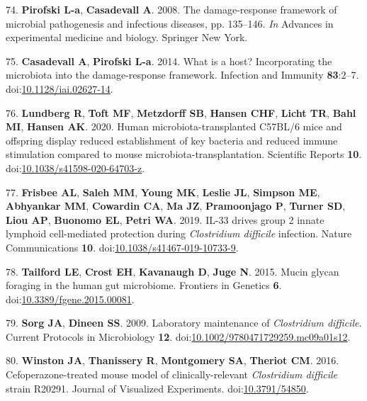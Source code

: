 \documentclass[
  12pt,
]{article}
\newenvironment{cslreferences}%
  {}%
  {\par}
\begin{document}
\begin{cslreferences}
\leavevmode\hypertarget{ref-Pirofski2008}{}%
74. \textbf{Pirofski L-a}, \textbf{Casadevall A}. 2008. The
damage-response framework of microbial pathogenesis and infectious
diseases, pp. 135--146. \emph{In} Advances in experimental medicine and
biology. Springer New York.

\leavevmode\hypertarget{ref-Casadevall2014}{}%
75. \textbf{Casadevall A}, \textbf{Pirofski L-a}. 2014. What is a host?
Incorporating the microbiota into the damage-response framework.
Infection and Immunity \textbf{83}:2--7.
doi:\href{https://doi.org/10.1128/iai.02627-14}{10.1128/iai.02627-14}.

\leavevmode\hypertarget{ref-Lundberg2020}{}%
76. \textbf{Lundberg R}, \textbf{Toft MF}, \textbf{Metzdorff SB},
\textbf{Hansen CHF}, \textbf{Licht TR}, \textbf{Bahl MI}, \textbf{Hansen
AK}. 2020. Human microbiota-transplanted C57BL/6 mice and offspring
display reduced establishment of key bacteria and reduced immune
stimulation compared to mouse microbiota-transplantation. Scientific
Reports \textbf{10}.
doi:\href{https://doi.org/10.1038/s41598-020-64703-z}{10.1038/s41598-020-64703-z}.

\leavevmode\hypertarget{ref-Frisbee2019}{}%
77. \textbf{Frisbee AL}, \textbf{Saleh MM}, \textbf{Young MK},
\textbf{Leslie JL}, \textbf{Simpson ME}, \textbf{Abhyankar MM},
\textbf{Cowardin CA}, \textbf{Ma JZ}, \textbf{Pramoonjago P},
\textbf{Turner SD}, \textbf{Liou AP}, \textbf{Buonomo EL}, \textbf{Petri
WA}. 2019. IL-33 drives group 2 innate lymphoid cell-mediated protection
during \emph{Clostridium difficile} infection. Nature Communications
\textbf{10}.
doi:\href{https://doi.org/10.1038/s41467-019-10733-9}{10.1038/s41467-019-10733-9}.

\leavevmode\hypertarget{ref-Tailford2015}{}%
78. \textbf{Tailford LE}, \textbf{Crost EH}, \textbf{Kavanaugh D},
\textbf{Juge N}. 2015. Mucin glycan foraging in the human gut
microbiome. Frontiers in Genetics \textbf{6}.
doi:\href{https://doi.org/10.3389/fgene.2015.00081}{10.3389/fgene.2015.00081}.

\leavevmode\hypertarget{ref-Sorg2009}{}%
79. \textbf{Sorg JA}, \textbf{Dineen SS}. 2009. Laboratory maintenance
of \emph{Clostridium difficile}. Current Protocols in Microbiology
\textbf{12}.
doi:\href{https://doi.org/10.1002/9780471729259.mc09a01s12}{10.1002/9780471729259.mc09a01s12}.

\leavevmode\hypertarget{ref-Winston2016}{}%
80. \textbf{Winston JA}, \textbf{Thanissery R}, \textbf{Montgomery SA},
\textbf{Theriot CM}. 2016. Cefoperazone-treated mouse model of
clinically-relevant \emph{Clostridium difficile} strain R20291. Journal
of Visualized Experiments.
doi:\href{https://doi.org/10.3791/54850}{10.3791/54850}.


\end{cslreferences}
\end{document}

